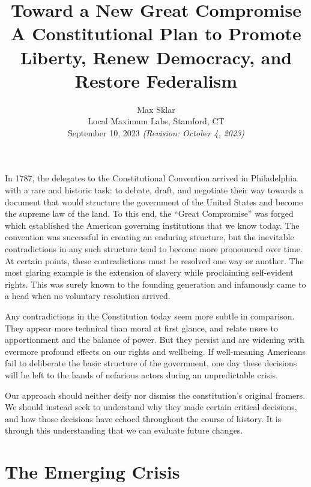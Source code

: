\documentclass{article}
\newcommand{\quotes}[1]{``#1''}
\begin{document}
\parindent=0in
\parskip=12pt

\title{
  Toward a New Great Compromise \\
  \large{
    A Constitutional Plan to Promote Liberty, Renew Democracy, and Restore Federalism
  }
}

\author{Max Sklar \\ Local Maximum Labs, Stamford, CT \\ September 10, 2023 \small{\textit{(Revision: October 4, 2023)}}}
\date{}

\maketitle

In 1787, the delegates to the Constitutional Convention arrived in Philadelphia with a rare and historic task: to debate, draft, and negotiate their way towards a document that would structure the government of the United States and become the supreme law of the land. To this end, the \quotes{Great Compromise} was forged which established the American governing institutions that we know today. The convention was successful in creating an enduring structure, but the inevitable contradictions in any such structure tend to become more pronounced over time. At certain points, these contradictions must be resolved one way or another. The most glaring example is the extension of slavery while proclaiming self-evident rights. This was surely known to the founding generation and infamously came to a head when no voluntary resolution arrived.

Any contradictions in the Constitution today seem more subtle in comparison. They appear more technical than moral at first glance, and relate more to apportionment and the balance of power. But they persist and are widening with evermore profound effects on our rights and wellbeing. If well-meaning Americans fail to deliberate the basic structure of the government, one day these decisions will be left to the hands of nefarious actors during an unpredictable crisis.

Our approach should neither deify nor dismiss the constitution's original framers. We should instead seek to understand why they made certain critical decisions, and how those decisions have echoed throughout the course of history. It is through this understanding that we can evaluate future changes.

\section{The Emerging Crisis}
\end{document}
